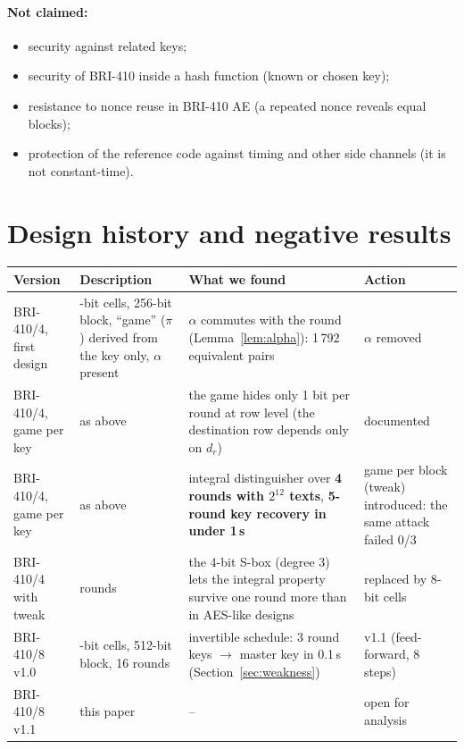 \documentclass[11pt,a4paper]{article}
\begin{document}
\paragraph{Not claimed:}
\begin{itemize}
\item security against related keys;
\item security of BRI-410 inside a hash function (known or chosen key);
\item resistance to nonce reuse in BRI-410 AE (a repeated nonce reveals equal blocks);
\item protection of the reference code against timing and other side channels (it is not constant-time).
\end{itemize}

\section{Design history and negative results}\label{sec:history}

\begin{center}\small
\begin{tabularx}{\textwidth}{@{}>{\raggedright\arraybackslash}p{2.6cm}>{\raggedright\arraybackslash}X%
>{\raggedright\arraybackslash}X>{\raggedright\arraybackslash}p{3.2cm}@{}}
\toprule
Version & Description & What we found & Action\\
\midrule
BRI-410/4, first design & 4-bit cells, 256-bit block, ``game'' ($\pi$) derived from the key only, $\alpha$
  present & $\alpha$ commutes with the round (Lemma~\ref{lem:alpha}): 1\,792 equivalent pairs & $\alpha$ removed\\
BRI-410/4, game per key & as above & the game hides only 1 bit per round at row level (the destination row depends
  only on $d_r$) & documented\\
BRI-410/4, game per key & as above & integral distinguisher over \textbf{4 rounds with $2^{12}$ texts},
  \textbf{5-round key recovery in under 1\,s} & game per block (tweak) introduced: the same attack failed 0/3\\
BRI-410/4 with tweak & 32 rounds & the 4-bit S-box (degree 3) lets the integral property survive one round more
  than in AES-like designs & replaced by 8-bit cells\\
BRI-410/8 v1.0 & 8-bit cells, 512-bit block, 16 rounds & invertible schedule: 3 round keys $\to$ master key in
  0.1\,s (Section~\ref{sec:weakness}) & v1.1 (feed-forward, 8 steps)\\
BRI-410/8 v1.1 & this paper & -- & open for analysis\\
\bottomrule
\end{tabularx}
\end{center}
\end{document}
